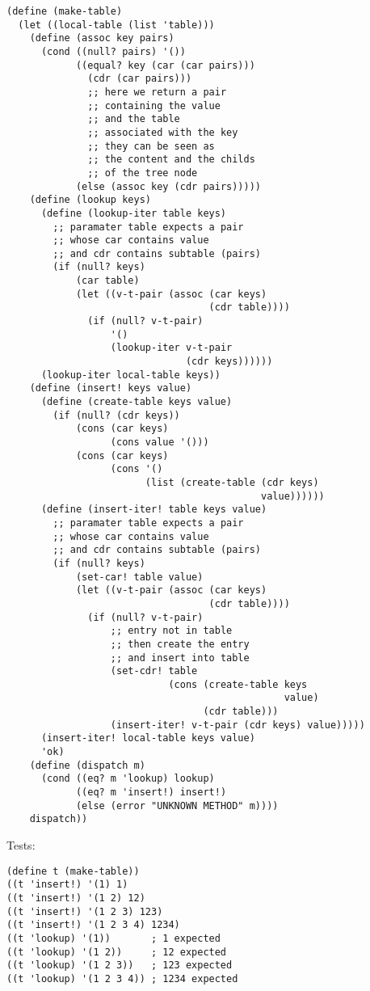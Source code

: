 \documentclass[../main.tex]{subfiles}
\begin{document}
\begin{lstlisting}
(define (make-table)
  (let ((local-table (list 'table)))
    (define (assoc key pairs)
      (cond ((null? pairs) '())
            ((equal? key (car (car pairs)))
              (cdr (car pairs)))
              ;; here we return a pair
              ;; containing the value
              ;; and the table
              ;; associated with the key
              ;; they can be seen as
              ;; the content and the childs
              ;; of the tree node
            (else (assoc key (cdr pairs)))))
    (define (lookup keys)
      (define (lookup-iter table keys)
        ;; paramater table expects a pair
        ;; whose car contains value
        ;; and cdr contains subtable (pairs)
        (if (null? keys)
            (car table)
            (let ((v-t-pair (assoc (car keys)
                                   (cdr table))))
              (if (null? v-t-pair)
                  '()
                  (lookup-iter v-t-pair
                               (cdr keys))))))
      (lookup-iter local-table keys))
    (define (insert! keys value)
      (define (create-table keys value)
        (if (null? (cdr keys))
            (cons (car keys)
                  (cons value '()))
            (cons (car keys)
                  (cons '()
                        (list (create-table (cdr keys)
                                            value))))))
      (define (insert-iter! table keys value)
        ;; paramater table expects a pair
        ;; whose car contains value
        ;; and cdr contains subtable (pairs)
        (if (null? keys)
            (set-car! table value)
            (let ((v-t-pair (assoc (car keys)
                                   (cdr table))))
              (if (null? v-t-pair)
                  ;; entry not in table
                  ;; then create the entry
                  ;; and insert into table
                  (set-cdr! table
                            (cons (create-table keys
                                                value)
                                  (cdr table)))
                  (insert-iter! v-t-pair (cdr keys) value)))))
      (insert-iter! local-table keys value)
      'ok)
    (define (dispatch m)
      (cond ((eq? m 'lookup) lookup)
            ((eq? m 'insert!) insert!)
            (else (error "UNKNOWN METHOD" m))))
    dispatch))
\end{lstlisting}

Tests:

\begin{lstlisting}
(define t (make-table))
((t 'insert!) '(1) 1)
((t 'insert!) '(1 2) 12)
((t 'insert!) '(1 2 3) 123)
((t 'insert!) '(1 2 3 4) 1234)
((t 'lookup) '(1))       ; 1 expected
((t 'lookup) '(1 2))     ; 12 expected
((t 'lookup) '(1 2 3))   ; 123 expected
((t 'lookup) '(1 2 3 4)) ; 1234 expected
\end{lstlisting}
\end{document}
